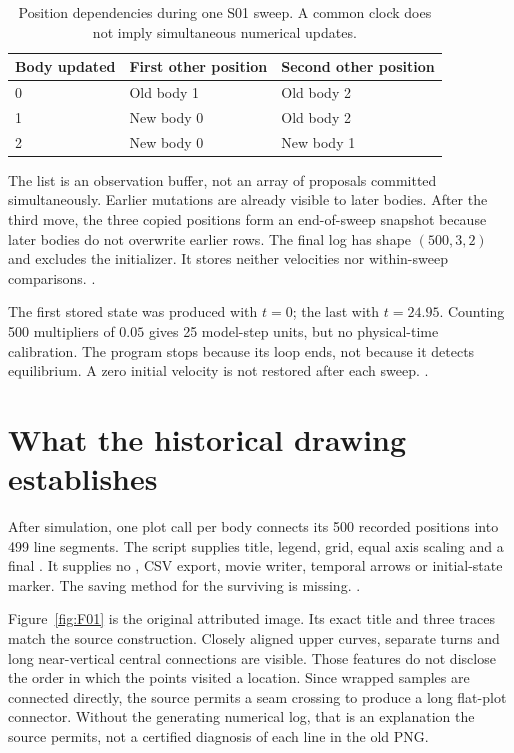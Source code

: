 \begin{table}[htbp]\centering
\caption{Position dependencies during one S01 sweep. A common clock does
not imply simultaneous numerical updates.}\label{tab:order01}
\begin{tabular}{@{}lll@{}}\toprule
Body updated & First other position & Second other position\\\midrule
0 & Old body 1 & Old body 2\\
1 & New body 0 & Old body 2\\
2 & New body 0 & New body 1\\\bottomrule
\end{tabular}
\end{table}

The list is an observation buffer, not an array of proposals committed
simultaneously. Earlier mutations are already visible to later bodies.
After the third move, the three copied positions form an end-of-sweep
snapshot because later bodies do not overwrite earlier rows.
The final log has shape $(500,3,2)$ and excludes the initializer.
It stores neither velocities nor within-sweep comparisons.
. 

The first stored state was produced with $t=0$; the last with $t=24.95$.
Counting 500 multipliers of $0.05$ gives 25 model-step units, but no
physical-time calibration. The program stops because its loop ends, not
because it detects equilibrium. A zero initial velocity is not restored
after each sweep. . 

\section{What the historical drawing establishes}
After simulation, one plot call per body connects its 500 recorded positions
into 499 line segments. The script supplies title, legend, grid, equal
axis scaling and a final . It supplies no
, CSV export, movie writer, temporal arrows or
initial-state marker. The saving method for the surviving
 is missing. . 

Figure~\ref{fig:F01} is the original attributed image. Its exact title
and three traces match the source construction. Closely aligned upper
curves, separate turns and long near-vertical central connections are
visible. Those features do not disclose the order in which the points
visited a location. Since wrapped samples are connected directly,
the source permits a seam crossing to produce a long flat-plot connector.
Without the generating numerical log, that is an explanation the source
permits, not a certified diagnosis of each line in the old PNG.
\cite{construction01} 

